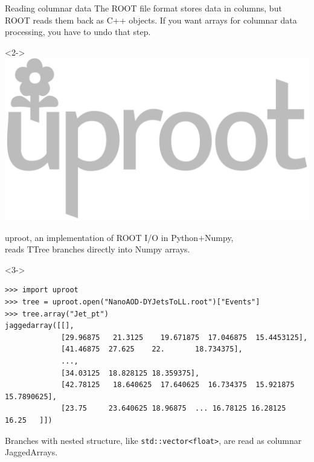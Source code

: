 \documentclass[aspectratio=169]{beamer}
\begin{document}
\begin{frame}[fragile]{Reading columnar data}
\vspace{0.5 cm}
The ROOT file format stores data in columns, but ROOT reads them back as C++ objects. If you want arrays for columnar data processing, you have to undo that step.

\vspace{0.5 cm}
\begin{uncoverenv}<2->
\hfill \includegraphics[height=2 cm]{uproot-logo.pdf}

\vspace{-2 cm}
uproot, an implementation of ROOT I/O in Python$+$Numpy, \\
reads TTree branches directly into Numpy arrays.
\end{uncoverenv}

\vspace{0.25 cm}
\begin{uncoverenv}<3->
\scriptsize
\begin{verbatim}
>>> import uproot
>>> tree = uproot.open("NanoAOD-DYJetsToLL.root")["Events"]
>>> tree.array("Jet_pt")
jaggedarray([[],
             [29.96875   21.3125    19.671875  17.046875  15.4453125],
             [41.46875  27.625    22.       18.734375],
             ...,
             [34.03125  18.828125 18.359375],
             [42.78125   18.640625  17.640625  16.734375  15.921875  15.7890625],
             [23.75     23.640625 18.96875  ... 16.78125 16.28125 16.25   ]])
\end{verbatim}

\small
\vspace{0.1 cm}
Branches with nested structure, like {\tt\scriptsize std::vector<float>}, are read as columnar JaggedArrays.
\end{uncoverenv}
\end{frame}
\end{document}
